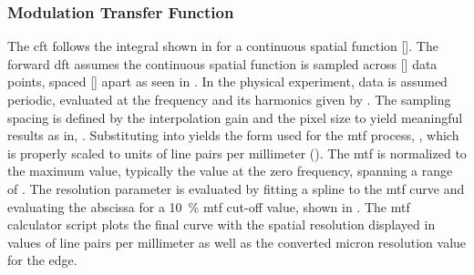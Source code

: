 \documentclass[../../../../main.tex]{subfiles}
\begin{document}
%
    \subsubsection{Modulation Transfer Function}%
    \label{app:image-processing:modulation-transfer-function:analytical-methods:modulation-transfer-function}%
    The \gls{cft}  follows the integral shown in  for a continuous spatial function [].
    The forward \gls{dft}  assumes the continuous spatial function is sampled across [] data points, spaced [] apart as seen in .
    In the physical experiment, data is assumed periodic, evaluated at the frequency \Xvariable{\omega} and its harmonics given by .
    The sampling spacing  is defined by the interpolation gain  and the pixel size  to yield meaningful results as in, .
    Substituting into  yields the form used for the \gls{mtf} process, , which is properly scaled to units of line pairs per millimeter (\si{\linepairs}).
    The \gls{mtf} is normalized to the maximum value, typically the value at the zero frequency, spanning a range of .
    The resolution parameter is evaluated by fitting a spline to the \gls{mtf} curve and evaluating the abscissa for a \SI{10}{\percent} \gls{mtf} cut-off value, shown in .
    The \gls{mtf} calculator script plots the final curve with the spatial resolution displayed in values of line pairs per millimeter as well as the converted micron resolution value for the edge.
\end{document}
